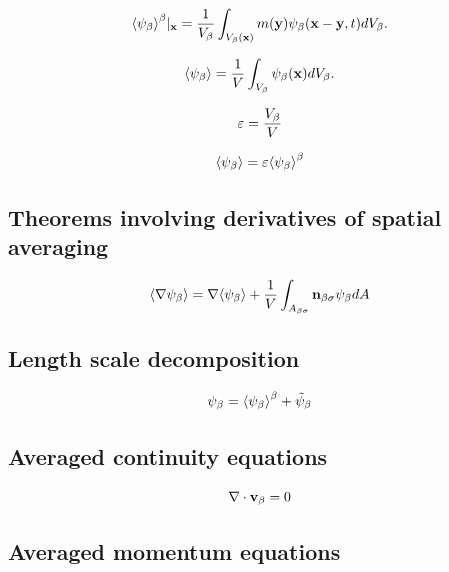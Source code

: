 \begin{equation}
{\left< \psi_{\beta} \right>}^{\beta}|_{\mathbf{x}} = \dfrac{1}{V_\beta} \int_{V_\beta(\mathbf{x})}  m(\mathbf{y}) \psi_{\beta}(\mathbf{x}-\mathbf{y}, t) d V_\beta.
\label{eq:avg_intrinsic_ext}
\end{equation}

\begin{equation}
{\left< \psi_{\beta} \right>} = \dfrac{1}{V} \int_{V_\beta} \psi_\beta (\mathbf{x}) d V_\beta.
\label{eq:avg_superficial}
\end{equation}


\begin{equation}
	\varepsilon = \dfrac{V_\beta}{V}
	\label{eq:porosity}
\end{equation}

\begin{equation}
	{\left< \psi_{\beta} \right>} =  \varepsilon {\left< \psi_{\beta} \right>}^{\beta}
\end{equation}

\subsection{Theorems involving derivatives of spatial averaging}

\begin{theorem}
\[	{\left< \nabla \psi_{\beta} \right>} = \nabla {\left< \psi_{\beta} \right>} + \dfrac{1}{V}\int_{A_{\beta \sigma}} \mathbf{n}_{\beta \sigma} \psi_{\beta} dA \]
\end{theorem}


\subsection{Length scale decomposition}

\begin{equation}
	\psi_{\beta} = {\left< \psi_{\beta} \right>}^{\beta} + \tilde{\psi}_{\beta}
 \end{equation}

\subsection{Averaged continuity equations}


\begin{equation}
\nabla \cdot \textbf{v}_{\beta} = 0
\label{eq:cont}
\end{equation}

\subsection{Averaged momentum equations}


